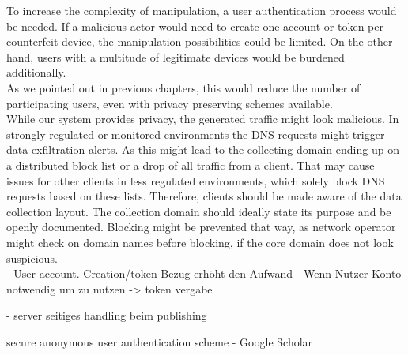     To increase the complexity of manipulation, a user authentication process would be needed. If a malicious actor would need to create one account or token per counterfeit device, the manipulation possibilities could be limited. On the other hand, users with a multitude of legitimate devices would be burdened additionally.\\ 
    As we pointed out in previous chapters, this would reduce the number of participating users, even with privacy preserving schemes available.\\

    
    While our system provides privacy, the generated traffic might look malicious.
    In strongly regulated or monitored environments the DNS requests might trigger data exfiltration alerts. As this might lead to the collecting domain ending up on a distributed block list or a drop of all traffic from a client. That may cause issues for other clients in less regulated environments, which solely block DNS requests based on these lists.
    Therefore, clients should be made aware of the data collection layout. The collection domain should ideally state its purpose and be openly documented. Blocking might be prevented that way, as network operator might check on domain names before blocking, if the core domain does not look suspicious.\\

- User account. Creation/token Bezug erhöht den Aufwand
- Wenn Nutzer Konto notwendig um zu nutzen -> token vergabe

- server seitiges handling beim publishing




secure anonymous user authentication scheme - Google Scholar





